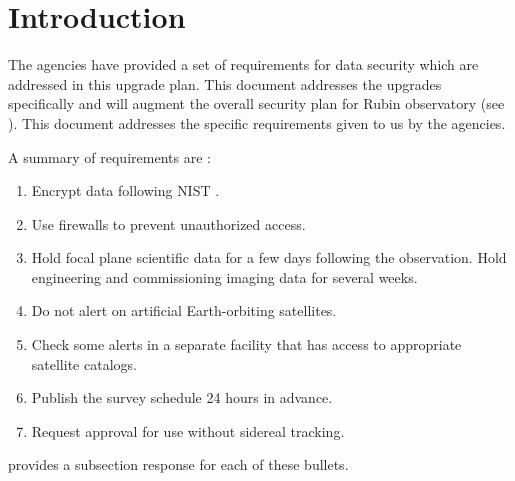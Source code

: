 \section{Introduction}

The agencies have provided a set of requirements for data security which are addressed in this upgrade plan.  This document addresses the upgrades specifically and will augment the overall security plan for Rubin observatory (see ).
This document addresses the specific requirements given to us by the agencies.

A summary of requirements are :
\begin{enumerate}

\item	Encrypt data following \gls{NIST} .
\item	Use firewalls to prevent unauthorized  access.
\item	Hold focal plane scientific data for a few days following the observation. Hold engineering and commissioning imaging data for several weeks.
\item	Do not alert on artificial Earth-orbiting satellites.
\item	Check some alerts in a separate facility that has access to appropriate satellite catalogs.
\item	Publish the survey schedule 24 hours in advance.
\item	Request approval for use  without sidereal tracking.

\end{enumerate}


 provides a subsection response for each of these bullets.
